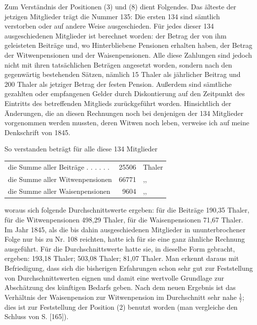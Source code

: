 \noindent\hspace*{\parindent}Zum Verständnis der Positionen (3) und (8) dient Folgendes. Das älteste der jetzigen Mitglieder trägt die Nummer 135: Die ersten 134 sind sämtlich verstorben oder auf andere Weise ausgeschieden. Für jedes dieser 134 ausgeschiedenen Mitglieder ist berechnet worden: der Betrag der von ihm geleisteten Beiträge und, wo Hinterbliebene Pensionen erhalten haben, der Betrag der Witwenpensionen und der Waisenpensionen. Alle diese Zahlungen sind jedoch nicht mit ihren tatsächlichen Beträgen angesetzt worden, sondern nach den gegenwärtig bestehenden Sätzen, nämlich 15 Thaler als jährlicher Beitrag und 200 Thaler als jetziger Betrag der festen Pension. Außerdem sind sämtliche gezahlten oder empfangenen Gelder durch Diskontierung auf den Zeitpunkt des Eintritts des betreffenden Mitglieds zurückgeführt worden. Hinsichtlich der Änderungen, die an diesen Rechnungen noch bei denjenigen der 134 Mitglieder vorgenommen werden mussten, deren Witwen noch leben, verweise ich auf meine Denkschrift von 1845.

So verstanden beträgt für alle diese 134 Mitglieder
\begin{center}
\begin{tabular}{l r l}
die Summe aller Beiträge . . . . . .&25506&Thaler\\
die Summe aller Witwenpensionen&66771&,,\\
die Summe aller Waisenpensionen&9604&,,
\end{tabular}
\end{center}
\noindent woraus sich folgende Durchschnittswerte ergeben: für die Beiträge 190,35 Thaler, für die Witwenpensionen 498,29 Thaler, für die Waisenpensionen 71,67 Thaler. Im Jahr 1845, als die bis dahin ausgeschiedenen Mitglieder in ununterbrochener Folge nur bis zu Nr. 108 reichten, hatte ich für sie eine ganz ähnliche Rechnung ausgeführt. Für die Durchschnittswerte hatte sie, in dieselbe Form gebracht, ergeben: 193,18 Thaler; 503,08 Thaler; 81,07 Thaler. Man erkennt daraus mit Befriedigung, dass sich die bisherigen Erfahrungen schon sehr gut zur Feststellung von Durchschnittswerten eignen und damit eine wertvolle Grundlage zur Abschätzung des künftigen Bedarfs geben. Nach dem neuen Ergebnis ist das Verhältnis der Waisenpension zur Witwenpension im Durchschnitt sehr nahe \(\tfrac{1}{7}\); dies ist zur Feststellung der Position (2) benutzt worden (man vergleiche den Schluss von S. [165]).

